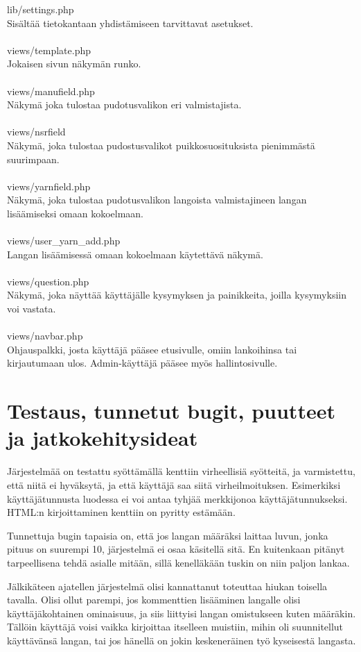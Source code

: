 \documentclass[12pt]{article}
\begin{document}
lib/settings.php\\
Sisältää tietokantaan yhdistämiseen tarvittavat asetukset.\\
\ \\
views/template.php\\
Jokaisen sivun näkymän runko.\\
\ \\
views/manufield.php\\
Näkymä joka tulostaa pudotusvalikon eri valmistajista.\\
\ \\
views/nsrfield\\ 
Näkymä, joka tulostaa pudostusvalikot puikkosuosituksista pienimmästä suurimpaan.\\
\ \\
views/yarnfield.php\\
Näkymä, joka tulostaa pudotusvalikon langoista valmistajineen langan lisäämiseksi omaan kokoelmaan.\\
\ \\
views/user\_yarn\_add.php\\
Langan lisäämisessä omaan kokoelmaan käytettävä näkymä.\\
\ \\
views/question.php\\
Näkymä, joka näyttää käyttäjälle kysymyksen ja painikkeita, joilla kysymyksiin voi vastata.\\
\ \\
views/navbar.php\\
Ohjauspalkki, josta käyttäjä pääsee etusivulle, omiin lankoihinsa tai kirjautumaan ulos. Admin-käyttäjä pääsee myös hallintosivulle.\\
\section{Testaus, tunnetut bugit, puutteet ja jatkokehitysideat}
Järjestelmää on testattu syöttämällä kenttiin virheellisiä syötteitä, ja varmistettu, että niitä ei hyväksytä, ja että käyttäjä saa siitä virheilmoituksen. Esimerkiksi käyttäjätunnusta luodessa ei voi antaa tyhjää merkkijonoa käyttäjätunnukseksi. HTML:n kirjoittaminen kenttiin on pyritty estämään.

Tunnettuja bugin tapaisia on, että jos langan määräksi laittaa luvun, jonka pituus on suurempi 10, järjestelmä ei osaa käsitellä sitä. En kuitenkaan pitänyt tarpeellisena tehdä asialle mitään, sillä kenelläkään tuskin on niin paljon lankaa. 

Jälkikäteen ajatellen järjestelmä olisi kannattanut toteuttaa hiukan toisella tavalla. Olisi ollut parempi, jos kommenttien lisääminen langalle olisi käyttäjäkohtainen ominaisuus, ja siis liittyisi langan omistukseen kuten määräkin. Tällöin käyttäjä voisi vaikka kirjoittaa itselleen muistiin, mihin oli suunnitellut käyttävänsä langan, tai jos hänellä on jokin keskeneräinen työ kyseisestä langasta.
\end{document}
